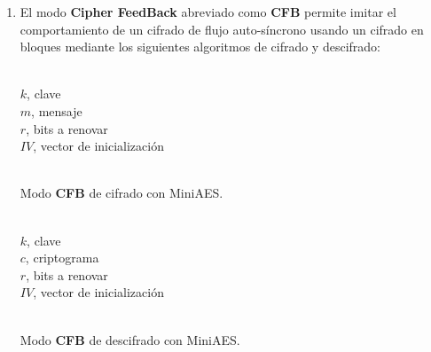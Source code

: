 \begin{enumerate}
		\item El modo \textbf{Cipher FeedBack} abreviado como \textbf{CFB} permite imitar el comportamiento de
		un cifrado de flujo auto-síncrono usando un cifrado en bloques mediante los siguientes algoritmos de
		cifrado y descifrado:
		\begin{algorithm}[H]
			\begin{algorithmic}[1]
				\REQUIRE \ \\
					\texttt{$k$}, clave\\
					\texttt{$m$}, mensaje\\
					\texttt{$r$}, bits a renovar\\
					\texttt{$IV$}, vector de inicialización\\ \
				\ENDFOR
			\end{algorithmic}
			\caption{Modo \textbf{CFB} de cifrado con MiniAES.}
			\label{EncCFB}
		\end{algorithm}
		\begin{algorithm}[H]
			\begin{algorithmic}[1]
				\REQUIRE \ \\
					\texttt{$k$}, clave\\
					\texttt{$c$}, criptograma\\
					\texttt{$r$}, bits a renovar\\
					\texttt{$IV$}, vector de inicialización\\ \
				\STATE{\texttt{$x = IV$}}
				\ENDFOR
			\end{algorithmic}
			\caption{Modo \textbf{CFB} de descifrado con MiniAES.}
			\label{DecCFB}
		\end{algorithm}
	\end{enumerate}
